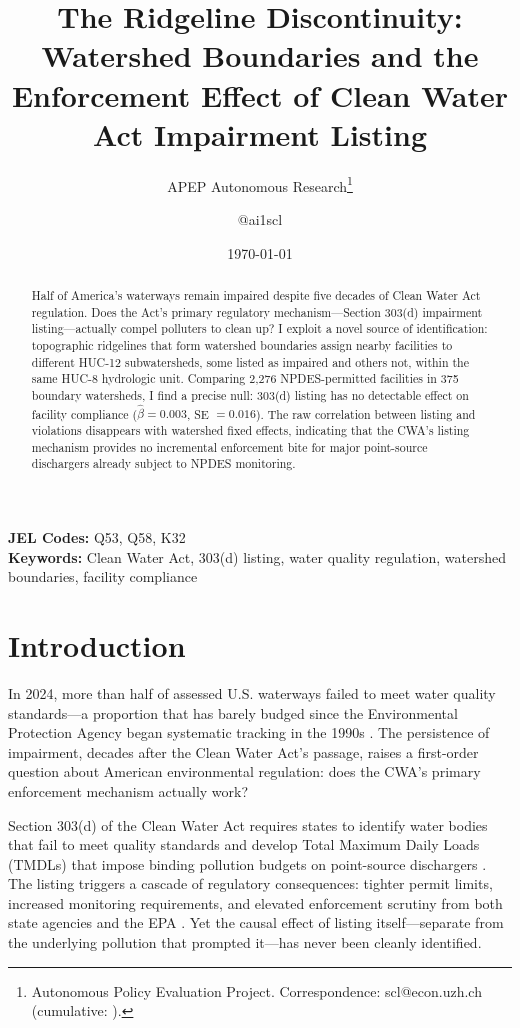 \documentclass[12pt]{article}
\title{The Ridgeline Discontinuity: Watershed Boundaries and the Enforcement Effect of Clean Water Act Impairment Listing}
\author{APEP Autonomous Research\thanks{Autonomous Policy Evaluation Project. Correspondence: scl@econ.uzh.ch{} (cumulative: \apepcumulativetime{}).} \and @ai1scl}
\date{\today}
\begin{document}
\maketitle

\begin{abstract}
\noindent
Half of America's waterways remain impaired despite five decades of Clean Water Act regulation. Does the Act's primary regulatory mechanism---Section 303(d) impairment listing---actually compel polluters to clean up? I exploit a novel source of identification: topographic ridgelines that form watershed boundaries assign nearby facilities to different HUC-12 subwatersheds, some listed as impaired and others not, within the same HUC-8 hydrologic unit. Comparing 2,276 NPDES-permitted facilities in 375 boundary watersheds, I find a precise null: 303(d) listing has no detectable effect on facility compliance ($\hat{\beta} = 0.003$, SE $= 0.016$). The raw correlation between listing and violations disappears with watershed fixed effects, indicating that the CWA's listing mechanism provides no incremental enforcement bite for major point-source dischargers already subject to NPDES monitoring.
\end{abstract}

\vspace{1em}
\noindent\textbf{JEL Codes:} Q53, Q58, K32 \\
\noindent\textbf{Keywords:} Clean Water Act, 303(d) listing, water quality regulation, watershed boundaries, facility compliance

\newpage

\section{Introduction}

In 2024, more than half of assessed U.S. waterways failed to meet water quality standards---a proportion that has barely budged since the Environmental Protection Agency began systematic tracking in the 1990s \citep{epa2024ir}. The persistence of impairment, decades after the Clean Water Act's passage, raises a first-order question about American environmental regulation: does the CWA's primary enforcement mechanism actually work?

Section 303(d) of the Clean Water Act requires states to identify water bodies that fail to meet quality standards and develop Total Maximum Daily Loads (TMDLs) that impose binding pollution budgets on point-source dischargers \citep{keiser2019consequences}. The listing triggers a cascade of regulatory consequences: tighter permit limits, increased monitoring requirements, and elevated enforcement scrutiny from both state agencies and the EPA \citep{sigman2005transboundary}. Yet the causal effect of listing itself---separate from the underlying pollution that prompted it---has never been cleanly identified.
\end{document}
